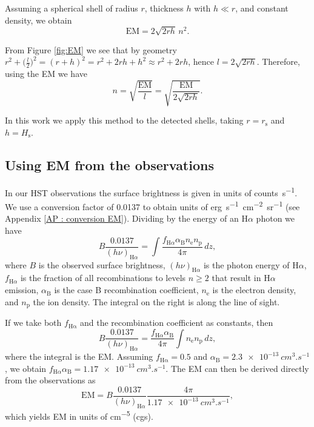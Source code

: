 \documentclass{book}
\begin{document}
Assuming a spherical shell of radius $r$, thickness $h$ with $h\ll r$,
and constant density, we obtain
\begin{equation}
  \mathrm{EM}=2\sqrt{2rh}\,n^2.
\end{equation}

From Figure \ref{fig:EM} we see that by geometry
$r^2+\Big(\frac{l}{2}\Big)^2=(r+h)^2=r^2+2rh+h^2\approx r^2+2rh$, hence
$l=2\sqrt{2rh}$. Therefore, using the EM we have
\begin{equation}
  n=\sqrt{\frac{\mathrm{EM}}{l}}=\sqrt{\frac{\mathrm{EM}}{2\sqrt{2rh}}}.
\end{equation}

In this work we apply this method to the detected shells, taking
$r=r_\mathrm{s}$ and $h=H_\mathrm{s}$.

\subsection{Using EM from the observations} \label{Subsec : EM}

In our HST observations the surface brightness is given in units of
\unit{counts.s^{-1}}. We use a conversion factor of 0.0137 to obtain
units of \unit{erg.s^{-1}.cm^{-2}.sr^{-1}} (see Appendix \ref{AP :
  conversion EM}). Dividing by the energy of an H$\alpha$ photon we
have
\begin{equation}
    B\frac{0.0137}{(h\nu)_{\mathrm{H}\alpha}}=\int \frac{f_{\mathrm{H}\alpha}\alpha_\mathrm{B} n_\mathrm{e} n_\mathrm{p}}{4\pi}\,dz,
\end{equation}
where $B$ is the observed surface brightness,
$(h\nu)_{\mathrm{H}\alpha}$ is the photon energy of H$\alpha$,
$f_{\mathrm{H}\alpha}$ is the fraction of all recombinations to levels
$n\geq 2$ that result in H$\alpha$ emission, $\alpha_\mathrm{B}$ is the
case B recombination coefficient, $n_\mathrm{e}$ is the electron
density, and $n_\mathrm{p}$ the ion density. The integral on the right
is along the line of sight.

If we take both $f_\mathrm{H\alpha}$ and the recombination coefficient
as constants, then
\begin{equation}
    B\frac{0.0137}{(h\nu)_{\mathrm{H}\alpha}}=\frac{f_{\mathrm{H}\alpha}\alpha_\mathrm{B}}{4\pi}\int n_\mathrm{e} n_\mathrm{p}\,dz,
\end{equation}
where the integral is the EM. Assuming
$f_\mathrm{H\alpha}=0.5$ and
$\alpha_\mathrm{B}=\SI{2.3e-13}{cm^{3}.s^{-1}}$, we obtain
$f_{\mathrm{H}\alpha}\alpha_\mathrm{B}=\SI{1.17e-13}{cm^3.s^{-1}}$. The
EM can then be derived directly from the observations as
\begin{equation}
    \mathrm{EM} = B\frac{0.0137}{(h\nu)_{\mathrm{H}\alpha}}\frac{4\pi}{\SI{1.17e-13}{cm^3.s^{-1}}},
\end{equation}
which yields EM in units of \unit{cm^{-5}} (cgs).
\end{document}
